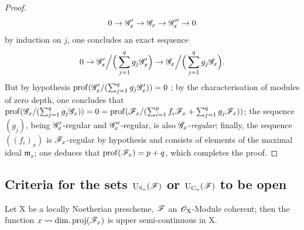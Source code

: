 \begin{proof}
\[
0\to\mathscr{G}'_x\to\mathscr{G}_x\to\mathscr{G}''_x\to 0
\]
by induction on $j$, one concludes an exact sequence
\[
0\to\mathscr{G}'_x\Big/\Big(\sum_{j=1}^q g_j\mathscr{G}'_x\Big)\to\mathscr{G}_x\Big/\Big(\sum_{j=1}^q g_j\mathscr{G}_x\Big).
\]
But by hypothesis $\operatorname{prof}(\mathscr{G}'_x/(\sum_{j=1}^q g_j\mathscr{G}'_x))=0$ ; by the characterisation  of modules of zero depth, one concludes that $\operatorname{prof}(\mathscr{G}_x/(\sum_{j=1}^q g_j\mathscr{G}_x))=0=\operatorname{prof}(\mathscr{F}_x/(\sum_{i=1}^p f_i\mathscr{F}_x+\sum_{j=1}^q g_j\mathscr{F}_x))$; the sequence $(g_j)$, being $\mathscr{G}'_x$-regular and $\mathscr{G}''_x$-regular, is also $\mathscr{G}_x$-\emph{regular}; finally, the sequence $((f_i)_x)$ is $\mathscr{F}_x$-regular by hypothesis and consists of elements of the maximal ideal $\mathfrak{m}_x$; one deduces  that $\operatorname{prof}(\mathscr{F}_x)=p+q$, which completes the proof.
\end{proof}


\subsection{Criteria for the sets \texorpdfstring{$\mathrm{U}_{\mathrm{S}_n}(\mathscr{F})$}{U\_Sn(F)} or \texorpdfstring{$\mathrm{U}_{\mathrm{C}_n}(\mathscr{F})$}{U\_Cn(F)} to be open}
\label{subsection:IV.6.11}
\label{IV.6.11}

\begin{lemma}[6.11.1]
\label{IV.6.11.1}
Let $\mathrm{X}$ be a locally Noetherian prescheme, $\mathscr{F}$ an $\mathscr{O}_\mathrm{X}$-Module
coherent; then the function $x\leadsto\operatorname{dim.proj}(\mathscr{F}_x)$ is upper semi-continuous in $\mathrm{X}$.
\end{lemma}

